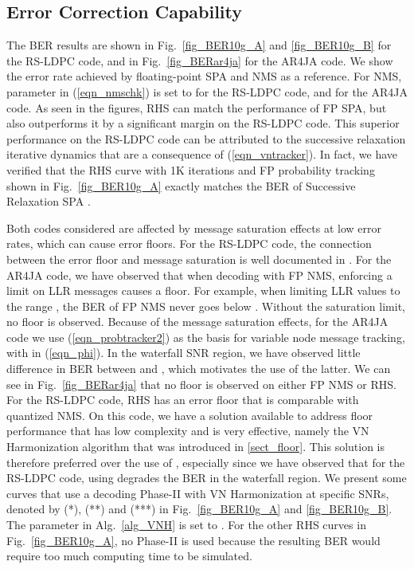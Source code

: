 \documentclass[12pt,journal,twoside,draftcls,onecolumn]{IEEEtran}
\begin{document}
\subsection{Error Correction Capability}
\label{sect_results::maxBER}

The BER results are shown in Fig.~\ref{fig_BER10g_A} and \ref{fig_BER10g_B} for the RS-LDPC code, and in Fig.~\ref{fig_BERar4ja} for the AR4JA code. We show the error rate achieved by floating-point SPA and NMS as a reference. For NMS, parameter  in (\ref{eqn_nmschk}) is set to  for the RS-LDPC code, and  for the AR4JA code. 
As seen in the figures, RHS can match the performance of FP SPA, but also outperforms it by a significant margin on the RS-LDPC code. 
This superior performance on the RS-LDPC code can be attributed to the successive relaxation iterative dynamics that are a consequence of (\ref{eqn_vntracker}). In fact, we have verified that the RHS curve with 1K iterations and FP probability tracking shown in Fig.~\ref{fig_BER10g_A} exactly matches the BER of Successive Relaxation SPA \cite{hemati:2006a}.

Both codes considered are affected by message saturation effects at low error rates, which can cause error floors. For the RS-LDPC code, the connection between the error floor and message saturation is well documented in \cite{schlegel:2010}. For the AR4JA code, we have observed that when decoding with FP NMS, enforcing a limit on LLR messages causes a floor. For example, when limiting LLR values to the range , the BER of FP NMS never goes below . Without the saturation limit, no floor is observed.
Because of the message saturation effects, for the AR4JA code we use (\ref{eqn_probtracker2}) as the basis for variable node message tracking, with  in (\ref{eqn_phi}). In the waterfall SNR region, we have observed little difference in BER between  and , which motivates the use of the latter. We can see in Fig.~\ref{fig_BERar4ja} that no floor is observed on either FP NMS or RHS.
For the RS-LDPC code, RHS has an error floor that is comparable with quantized NMS. On this code, we have a solution available to address floor performance that has low complexity and is very effective, namely the VN Harmonization algorithm that was introduced in \ref{sect_floor}. This solution is therefore preferred over the use of , especially since we have observed that for the RS-LDPC code, using  degrades the BER in the waterfall region. We present some curves that use a decoding Phase-II with VN Harmonization at specific SNRs, denoted by (*), (**) and (***) in Fig.~\ref{fig_BER10g_A} and \ref{fig_BER10g_B}. The parameter  in Alg.~\ref{alg_VNH} is set to . For the other RHS curves in Fig.~\ref{fig_BER10g_A}, no Phase-II is used because the resulting BER would require too much computing time to be simulated.
\end{document}
